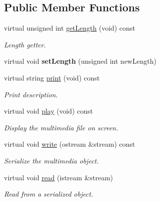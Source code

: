 \subsection*{Public Member Functions}
\begin{DoxyCompactItemize}
\item 
virtual unsigned int \hyperlink{class_video_a3b3cfffbd171368fcfb70cd58bff60a8}{get\-Length} (void) const 
\begin{DoxyCompactList}\small\item\em Length getter. \end{DoxyCompactList}\item 
\hypertarget{class_video_a01da0b8e9ee9f91e515cf453f03b1bea}{virtual void {\bfseries set\-Length} (unsigned int new\-Length)}\label{class_video_a01da0b8e9ee9f91e515cf453f03b1bea}

\item 
virtual string \hyperlink{class_video_a9f6e63647c81fabd59452ad1d695d190}{print} (void) const 
\begin{DoxyCompactList}\small\item\em Print description. \end{DoxyCompactList}\item 
\hypertarget{class_video_a0bcf77c9b87b314385c95d92c3cba71e}{virtual void \hyperlink{class_video_a0bcf77c9b87b314385c95d92c3cba71e}{play} (void) const }\label{class_video_a0bcf77c9b87b314385c95d92c3cba71e}

\begin{DoxyCompactList}\small\item\em Display the multimedia file on screen. \end{DoxyCompactList}\item 
virtual void \hyperlink{class_video_a4bfb8bf83498fa30a6515065559ccbff}{write} (ostream \&stream) const 
\begin{DoxyCompactList}\small\item\em Serialize the multimedia object. \end{DoxyCompactList}\item 
virtual void \hyperlink{class_video_a6be318a4e05ddfdb52fbcc1cab5ab573}{read} (istream \&stream)
\begin{DoxyCompactList}\small\item\em Read from a serialized object. \end{DoxyCompactList}\end{DoxyCompactItemize}
